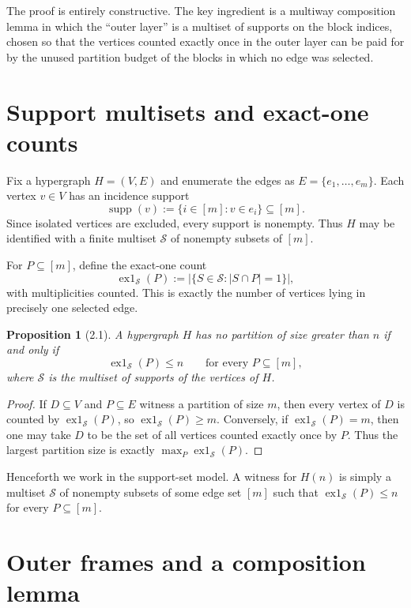 \documentclass[11pt]{article}
\newtheorem{proposition}[theorem]{Proposition}
\begin{document}
The proof is entirely constructive. The key ingredient is a multiway composition lemma in which the ``outer layer'' is a multiset of supports on the block indices, chosen so that the vertices counted exactly once in the outer layer can be paid for by the unused partition budget of the blocks in which no edge was selected.

\section{Support multisets and exact-one counts}

Fix a hypergraph $H=(V,E)$ and enumerate the edges as $E = \{e_1,\dots,e_m\}$. Each vertex $v \in V$ has an incidence support
\[
\operatorname{supp}(v) := \{ i \in [m] : v \in e_i \} \subseteq [m].
\]
Since isolated vertices are excluded, every support is nonempty. Thus $H$ may be identified with a finite multiset $\mathcal S$ of nonempty subsets of $[m]$.

For $P \subseteq [m]$, define the exact-one count
\[
\operatorname{ex1}_{\mathcal S}(P) := \bigl|\{ S \in \mathcal S : |S \cap P| = 1\}\bigr|,
\]
with multiplicities counted. This is exactly the number of vertices lying in precisely one selected edge.

\begin{proposition}[2.1]
A hypergraph $H$ has no partition of size greater than $n$ if and only if
\[
\operatorname{ex1}_{\mathcal S}(P) \le n \qquad \text{for every } P \subseteq [m],
\]
where $\mathcal S$ is the multiset of supports of the vertices of $H$.
\end{proposition}

\begin{proof}
If $D \subseteq V$ and $P \subseteq E$ witness a partition of size $m$, then every vertex of $D$ is counted by $\operatorname{ex1}_{\mathcal S}(P)$, so $\operatorname{ex1}_{\mathcal S}(P) \ge m$. Conversely, if $\operatorname{ex1}_{\mathcal S}(P)=m$, then one may take $D$ to be the set of all vertices counted exactly once by $P$. Thus the largest partition size is exactly $\max_P \operatorname{ex1}_{\mathcal S}(P)$.
\end{proof}

Henceforth we work in the support-set model. A witness for $H(n)$ is simply a multiset $\mathcal S$ of nonempty subsets of some edge set $[m]$ such that $\operatorname{ex1}_{\mathcal S}(P) \le n$ for every $P \subseteq [m]$.

\section{Outer frames and a composition lemma}
\end{document}
